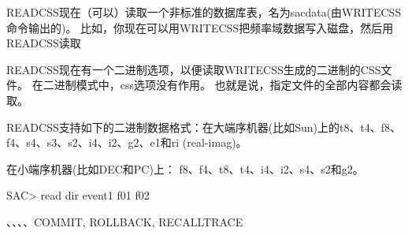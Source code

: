 READCSS现在（可以）读取一个非标准的数据库表，名为sacdata(由WRITECSS命令输出的)。%
比如，你现在可以用WRITECSS把频率域数据写入磁盘，然后用READCSS读取

READCSS现在有一个二进制选项，以便读取WRITECSS生成的二进制的CSS文件。
在二进制模式中，css选项没有作用。
也就是说，指定文件的全部内容都会读取。

READCSS支持如下的二进制数据格式：在大端序机器(比如Sun)上的t8、t4、f8、f4、s4、s3、s2、i4、i2、g2、e1和ri (real-imag)。

在小端序机器(比如DEC和PC)上： f8、f4、t8、t4、i4、i2、s4、s2和g2。

\begin{SACCode}
SAC> read dir event1 f01 f02
\end{SACCode}
、、、、COMMIT, ROLLBACK, RECALLTRACE
